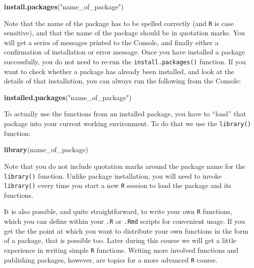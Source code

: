 \documentclass[]{book}
\newenvironment{Shaded}{\begin{snugshade}}{\end{snugshade}}
\newcommand{\KeywordTok}[1]{\textcolor[rgb]{0.13,0.29,0.53}{\textbf{#1}}}
\newcommand{\NormalTok}[1]{#1}
\newcommand{\StringTok}[1]{\textcolor[rgb]{0.31,0.60,0.02}{#1}}
\begin{document}
\begin{Shaded}
\begin{Highlighting}[]
\KeywordTok{install.packages}\NormalTok{(}\StringTok{"name_of_package"}\NormalTok{)}
\end{Highlighting}
\end{Shaded}

Note that the name of the package has to be spelled correctly (and \texttt{R} is case sensitive), and that the name of the package should be in quotation marks. You will get a series of messages printed to the Console, and finally either a confirmation of installation or error message. Once you have installed a package successfully, you do not need to re-run the \texttt{install.packages()} function. If you want to check whether a package has already been installed, and look at the details of that installation, you can always run the following from the Console:

\begin{Shaded}
\begin{Highlighting}[]
\KeywordTok{installed.packages}\NormalTok{(}\StringTok{"name_of_package"}\NormalTok{)}
\end{Highlighting}
\end{Shaded}

To actually use the functions from an installed package, you have to ``load'' that package into your current working environment. To do that we use the \texttt{library()} function:

\begin{Shaded}
\begin{Highlighting}[]
\KeywordTok{library}\NormalTok{(name_of_package)}
\end{Highlighting}
\end{Shaded}

Note that you do not include quotation marks around the package name for the \texttt{library()} function. Unlike package installation, you will need to invoke \texttt{library()} every time you start a new \texttt{R} session to load the package and its functions.

It is also possible, and quite straightforward, to write your own \texttt{R} functions, which you can define within your \texttt{.R} or \texttt{.Rmd} scripts for convenient usage. If you get the the point at which you want to distribute your own functions in the form of a package, that is possible too. Later during this course we will get a little experience in writing simple \texttt{R} functions. Writing more involved functions and publishing packages, however, are topics for a more advanced \texttt{R} course.
\end{document}
